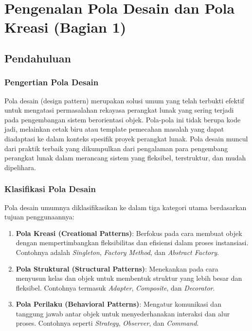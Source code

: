 \chapter{Pengenalan Pola Desain dan Pola Kreasi (Bagian 1)}

\section{Pendahuluan}

\subsection{Pengertian Pola Desain}
Pola desain (design pattern) merupakan solusi umum yang telah terbukti efektif untuk mengatasi permasalahan rekayasa perangkat lunak yang sering terjadi pada pengembangan sistem berorientasi objek. Pola-pola ini tidak berupa kode jadi, melainkan cetak biru atau template pemecahan masalah yang dapat diadaptasi ke dalam konteks spesifik proyek perangkat lunak. Pola desain muncul dari praktik terbaik yang dikumpulkan dari pengalaman para pengembang perangkat lunak dalam merancang sistem yang fleksibel, terstruktur, dan mudah dipelihara.

\subsection{Klasifikasi Pola Desain}
Pola desain umumnya diklasifikasikan ke dalam tiga kategori utama berdasarkan tujuan penggunaannya:
\begin{enumerate}
	\item \textbf{Pola Kreasi (Creational Patterns)}: Berfokus pada cara membuat objek dengan mempertimbangkan fleksibilitas dan efisiensi dalam proses instansiasi. Contohnya adalah \textit{Singleton}, \textit{Factory Method}, dan \textit{Abstract Factory}.
	\item \textbf{Pola Struktural (Structural Patterns)}: Menekankan pada cara menyusun kelas dan objek untuk membentuk struktur yang lebih besar dan fleksibel. Contohnya termasuk \textit{Adapter}, \textit{Composite}, dan \textit{Decorator}.
	\item \textbf{Pola Perilaku (Behavioral Patterns)}: Mengatur komunikasi dan tanggung jawab antar objek untuk menyederhanakan interaksi dan alur proses. Contohnya seperti \textit{Strategy}, \textit{Observer}, dan \textit{Command}.
\end{enumerate}

